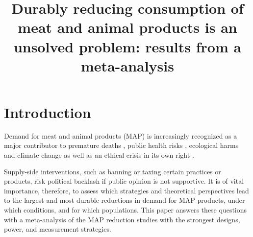 \documentclass[sn-nature,pdflatex]{sn-jnl}
\begin{document}
\title[MAP-reduction-meta]{Durably reducing consumption of meat and
animal products is an unsolved problem: results from a meta-analysis}


\author*[1]{  }

\author[1]{  }

\author[2]{  }








\maketitle

\section{Introduction}\label{sec1}

Demand for meat and animal products (MAP) is increasingly recognized as
a major contributor to premature deaths \citep{willett2019, landry2023},
public health risks \citep{slingenbergh2004, graham2008}, ecological
harms \citep{greger2010} and climate change
\citep{scarborough2023, koneswaran2008} as well as an ethical crisis in
its own right \citep{kuruc2023, singer2023}.

Supply-side interventions, such as banning or taxing certain practices
or products, risk political backlash if public opinion is not
supportive. It is of vital importance, therefore, to assess which
strategies and theoretical perspectives lead to the largest and most
durable reductions in demand for MAP products, under which conditions,
and for which populations. This paper answers these questions with a
meta-analysis of the MAP reduction studies with the strongest designs,
power, and measurement strategies.
\end{document}
